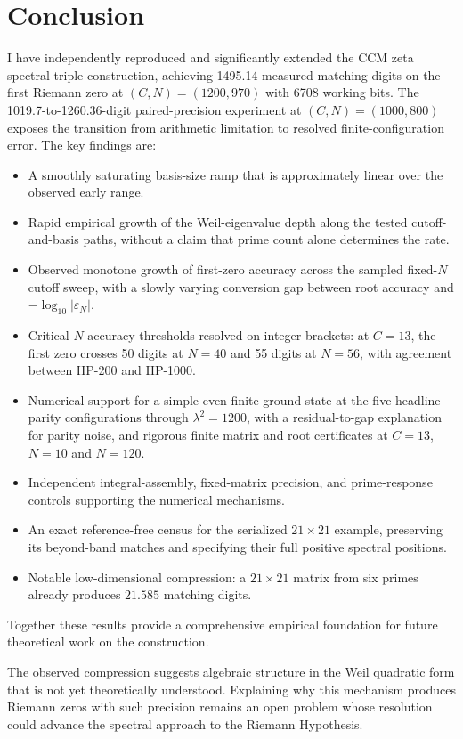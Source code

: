 \documentclass[11pt,a4paper]{article}
\begin{document}
\section{Conclusion}

I have independently reproduced and significantly extended the CCM
zeta spectral triple construction, achieving 1495.14 measured matching
digits on the first Riemann zero at $(C,N)=(1200,970)$ with
6708 working bits. The 1019.7-to-1260.36-digit paired-precision
experiment at $(C,N)=(1000,800)$ exposes the transition
from arithmetic limitation to resolved finite-configuration error. The key
findings are:
\begin{itemize}
\item A smoothly saturating basis-size ramp that is approximately
linear over the observed early range.
\item Rapid empirical growth of the Weil-eigenvalue depth along the
tested cutoff-and-basis paths, without a claim that prime count alone
determines the rate.
\item Observed monotone growth of first-zero accuracy across the sampled
fixed-$N$ cutoff sweep, with a slowly varying conversion gap between
root accuracy and $-\log_{10}|\varepsilon_N|$.
\item Critical-$N$ accuracy thresholds resolved on integer brackets:
at $C=13$, the first zero crosses 50 digits at $N=40$ and 55 digits
at $N=56$, with agreement between HP-200 and HP-1000.
\item Numerical support for a simple even finite ground state at the
five headline parity configurations through $\lambda^2=1200$,
with a residual-to-gap explanation for parity noise, and rigorous
finite matrix and root certificates at $C=13$, $N=10$ and $N=120$.
\item Independent integral-assembly, fixed-matrix precision, and
prime-response controls supporting the numerical mechanisms.
\item An exact reference-free census for the serialized $21\times21$
example, preserving its beyond-band matches and specifying their
full positive spectral positions.
\item Notable low-dimensional compression: a $21\times21$ matrix from
six primes already produces $21.585$ matching digits.
\end{itemize}
Together these results provide a comprehensive empirical foundation
for future theoretical work on the construction.

The observed compression suggests algebraic structure in the Weil
quadratic form that is not yet theoretically understood. Explaining
why this mechanism produces Riemann zeros with such precision remains
an open problem whose resolution could advance the spectral approach
to the Riemann Hypothesis.
\end{document}
